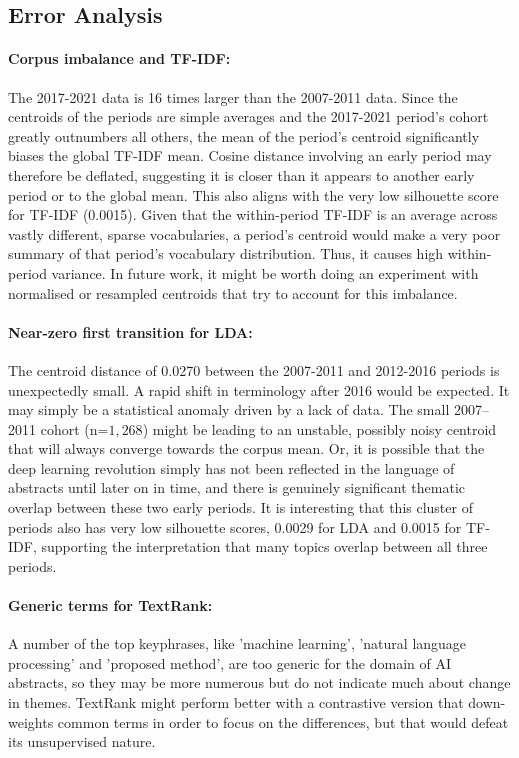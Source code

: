 \documentclass[11pt]{article}
\begin{document}
\subsection{Error Analysis}

\paragraph{Corpus imbalance and TF-IDF:}
The 2017-2021 data is 16 times larger than the 2007-2011 data. Since the centroids of the periods are simple averages and the 2017-2021 period's cohort greatly outnumbers all others, the mean of the period's centroid significantly biases the global TF-IDF mean. Cosine distance involving an early period may therefore be deflated, suggesting it is closer than it appears to another early period or to the global mean. This also aligns with the very low silhouette score for TF-IDF (0.0015). Given that the within-period TF-IDF is an average across vastly different, sparse vocabularies, a period's centroid would make a very poor summary of that period's vocabulary distribution. Thus, it causes high within-period variance. In future work, it might be worth doing an experiment with normalised or resampled centroids that try to account for this imbalance.

\paragraph{Near-zero first transition for LDA:}
The centroid distance of 0.0270 between the 2007-2011 and 2012-2016 periods is unexpectedly small.  A rapid shift in terminology after 2016 would be expected. It may simply be a statistical anomaly driven by a lack of data. The small 2007--2011 cohort (n=$1{,}268$) might be leading to an unstable, possibly noisy centroid that will always converge towards the corpus mean. Or, it is possible that the deep learning revolution simply has not been reflected in the language of abstracts until later on in time, and there is genuinely significant thematic overlap between these two early periods. It is interesting that this cluster of periods also has very low silhouette scores, 0.0029 for LDA and 0.0015 for TF-IDF, supporting the interpretation that many topics overlap between all three periods.

\paragraph{Generic terms for TextRank:}
A number of the top keyphrases, like 'machine learning', 'natural language processing' and 'proposed method', are too generic for the domain of AI abstracts, so they may be more numerous but do not indicate much about change in themes. TextRank might perform better with a contrastive version that down-weights common terms in order to focus on the differences, but that would defeat its unsupervised nature.
\end{document}
